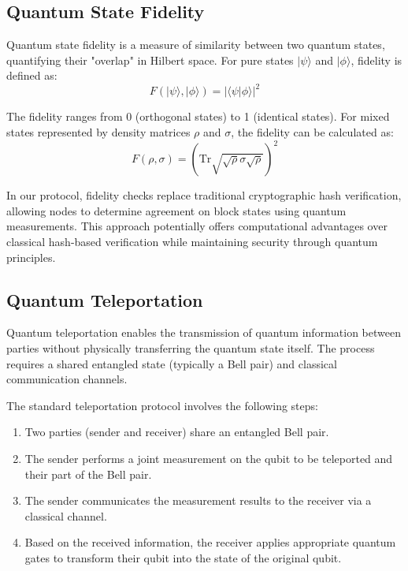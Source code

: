 \documentclass[11pt,a4paper]{article}
\begin{document}
\subsection{Quantum State Fidelity}
Quantum state fidelity is a measure of similarity between two quantum states, quantifying their "overlap" in Hilbert space. For pure states $|\psi\rangle$ and $|\phi\rangle$, fidelity is defined as:
\begin{equation}
F(|\psi\rangle, |\phi\rangle) = |\langle\psi|\phi\rangle|^2
\end{equation}

The fidelity ranges from 0 (orthogonal states) to 1 (identical states). For mixed states represented by density matrices $\rho$ and $\sigma$, the fidelity can be calculated as:
\begin{equation}
F(\rho, \sigma) = \left(\text{Tr}\sqrt{\sqrt{\rho}\sigma\sqrt{\rho}}\right)^2
\end{equation}

In our protocol, fidelity checks replace traditional cryptographic hash verification, allowing nodes to determine agreement on block states using quantum measurements. This approach potentially offers computational advantages over classical hash-based verification while maintaining security through quantum principles.

\subsection{Quantum Teleportation}
Quantum teleportation enables the transmission of quantum information between parties without physically transferring the quantum state itself. The process requires a shared entangled state (typically a Bell pair) and classical communication channels.

The standard teleportation protocol involves the following steps:
\begin{enumerate}
    \item Two parties (sender and receiver) share an entangled Bell pair.
    \item The sender performs a joint measurement on the qubit to be teleported and their part of the Bell pair.
    \item The sender communicates the measurement results to the receiver via a classical channel.
    \item Based on the received information, the receiver applies appropriate quantum gates to transform their qubit into the state of the original qubit.
\end{enumerate}
\end{document}
